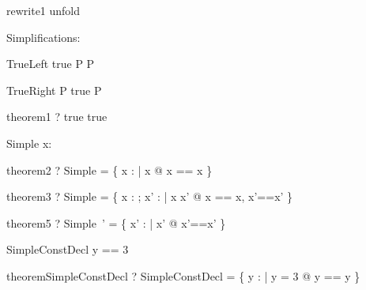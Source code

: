 \begin{zsection}
\SECTION rewrite1 \parents unfold
\end{zsection}

Simplifications:

\begin{zedrule}{TrueLeft}
  true \land P \iff P
\end{zedrule}

\begin{zedrule}{TrueRight}
  P \land true \iff P
\end{zedrule}



\begin{theorem}{theorem1}
  \vdash? true \iff true
\end{theorem}




\begin{schema}{Simple}
  x: \nat
\end{schema}

\begin{theorem}{theorem2}
  \vdash? Simple =
    \{ x : \arithmos | x \in \nat @ \lblot x == x \rblot \}
\end{theorem}

\begin{theorem}{theorem3}
  \vdash? \Delta Simple =
    \{ x : \arithmos; x' : \arithmos | x \in \nat \land x' \in \nat @
    \lblot x == x, x'==x' \rblot \}
\end{theorem}


\begin{theorem}{theorem5}
  \vdash? Simple~' =
    \{ x' : \arithmos | x' \in \nat @
    \lblot x'==x' \rblot \}
\end{theorem}



\begin{schema}{SimpleConstDecl}
  y == 3
\end{schema}

\begin{theorem}{theoremSimpleConstDecl}
  \vdash? SimpleConstDecl =
    \{ y : \arithmos | y = 3 @ \lblot y == y \rblot \}
\end{theorem}

